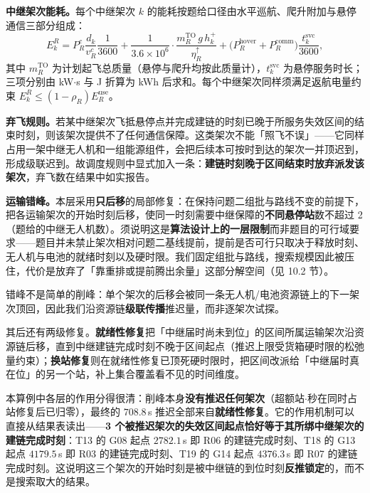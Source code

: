 \textbf{中继架次能耗。}每个中继架次 $k$ 的能耗按题给口径由水平巡航、爬升附加与悬停通信三部分组成：
\begin{equation}
	E^{R}_{k}=P^{c}_{R}\frac{d_{k}}{v^{c}_{R}}\frac{1}{3600}
	+\frac{1}{3.6\times10^{6}}\cdot\frac{m^{\mathrm{TO}}_{R}\,g\,h^{+}_{k}}{\eta^{\uparrow}_{R}}
	+\big(P^{\mathrm{hover}}_{R}+P^{\mathrm{comm}}_{R}\big)\frac{t^{\mathrm{svc}}_{k}}{3600},
	\label{eq:relay-energy}
\end{equation}
其中 $m^{\mathrm{TO}}_{R}$ 为计划起飞总质量（悬停与爬升均按此质量计），$t^{\mathrm{svc}}_{k}$ 为悬停服务时长；三项分别由 kW$\cdot$s 与 J 折算为 kWh 后求和。每个中继架次同样须满足返航电量约束 $E^{R}_{k}\le(1-\rho_{R})E^{\mathrm{use}}_{R}$。

\textbf{弃飞规则。}若某中继架次飞抵悬停点并完成建链的时刻已晚于所服务失效区间的结束时刻，则该架次提供不了任何通信保障。这类架次不能「照飞不误」——它同样占用一架中继无人机和一组能源组件，会把后续本可按时到达的架次一并顶迟到，形成级联迟到。故调度规则中显式加入一条：\textbf{建链时刻晚于区间结束时放弃派发该架次}，弃飞数在结果中如实报告。

\textbf{运输错峰。}本层采用\textbf{只后移}的局部修复：在保持问题二组批与路线不变的前提下，把各运输架次的开始时刻后移，使同一时刻需要中继保障的\textbf{不同悬停站}数不超过 2（题给的中继无人机数）。须说明这是\textbf{算法设计上的一层限制}而非题目的可行域要求——题目并未禁止架次相对问题二基线提前，提前是否可行只取决于释放时刻、无人机与电池的就绪时刻以及硬时限。我们固定组批与路线，搜索规模因此被压住，代价是放弃了「靠重排或提前腾出余量」这部分解空间（见 10.2 节）。

错峰不是简单的削峰：单个架次的后移会被同一条无人机/电池资源链上的下一架次顶回，因此我们沿资源链\textbf{级联传播}推迟量，而非逐架次试探。

其后还有两级修复。\textbf{就绪性修复}把「中继届时尚未到位」的区间所属运输架次沿资源链后移，直到中继建链完成时刻不晚于区间起点（推迟上限受货箱硬时限的松弛量约束）；\textbf{换站修复}则在就绪性修复已顶死硬时限时，把区间改派给「中继届时真在位」的另一个站，补上集合覆盖看不见的时间维度。

本算例中各层的作用分得很清：削峰本身\textbf{没有推迟任何架次}（超额站$\cdot$秒在同时占站修复后已归零），最终的 $708.8$\,s 推迟全部来自\textbf{就绪性修复}。它的作用机制可以直接从结果表读出——\textbf{3 个被推迟架次的失效区间起点恰好等于其所绑中继架次的建链完成时刻}：T13 的 G08 起点 $2782.1$\,s 即 R06 的建链完成时刻、T18 的 G13 起点 $4179.5$\,s 即 R03 的建链完成时刻、T19 的 G14 起点 $4376.3$\,s 即 R07 的建链完成时刻。这说明这三个架次的开始时刻是被中继链的到位时刻\textbf{反推锁定}的，而不是搜索取大的结果。

